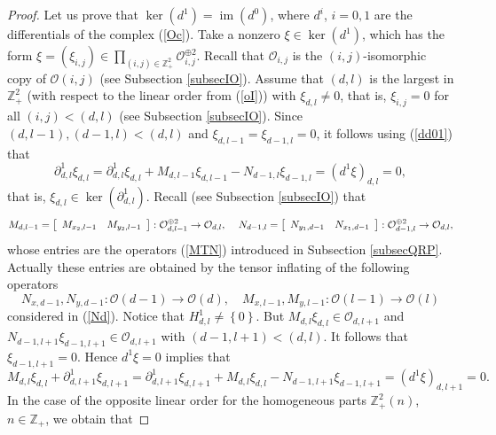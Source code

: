 \documentclass[12pt,reqno]{amsart}%
\theoremstyle{plain}
\numberwithin{theorem}{section} \numberwithin{equation}{section}
\numberwithin{lemma}{section}
\numberwithin{remark}{section}
\numberwithin{example}{section}
\numberwithin{proposition}{section}
\numberwithin{definition}{section}
\numberwithin{corollary}{section}
\begin{document}
\begin{proof}
Let us prove that $\ker\left(  d^{1}\right)  =\operatorname{im}\left(
d^{0}\right)  $, where $d^{i}$, $i=0,1$ are the differentials of the complex
(\ref{Oc}). Take a nonzero $\xi\in\ker\left(  d^{1}\right)  $, which has the
form $\xi=\left(  \xi_{i,j}\right)  \in\prod\limits_{\left(  i,j\right)
\in\mathbb{Z}_{+}^{2}}\mathcal{O}_{i,j}^{\oplus2}$. Recall that $\mathcal{O}%
_{i,j}$ is the $\left(  i,j\right)  $-isomorphic copy of $\mathcal{O}\left(
i,j\right)  $ (see Subsection \ref{subsecIO}). Assume that $\left(
d,l\right)  $ is the largest in $\mathbb{Z}_{+}^{2}$ (with respect to the
linear order from (\ref{oI})) with $\xi_{d,l}\neq0$, that is, $\xi_{i,j}=0$
for all $\left(  i,j\right)  <\left(  d,l\right)  $ (see Subsection
\ref{subsecIO}). Since $\left(  d,l-1\right)  ,\left(  d-1,l\right)  <\left(
d,l\right)  $ and $\xi_{d,l-1}=\xi_{d-1,l}=0$, it follows using (\ref{dd01})
that
\[
\partial_{d,l}^{1}\xi_{d,l}=\partial_{d,l}^{1}\xi_{d,l}+M_{d,l-1}\xi
_{d,l-1}-N_{d-1,l}\xi_{d-1,l}=\left(  d^{1}\xi\right)  _{d,l}=0,
\]
that is, $\xi_{d,l}\in\ker\left(  \partial_{d,l}^{1}\right)  $. Recall (see
Subsection \ref{subsecIO}) that
\[
M_{d,l-1}=\left[
\begin{array}
[c]{cc}%
M_{x_{2},l-1} & M_{y_{2},l-1}%
\end{array}
\right]  :\mathcal{O}_{d,l-1}^{\oplus2}\rightarrow\mathcal{O}_{d,l}\text{,
\quad}N_{d-1,l}=\left[
\begin{array}
[c]{cc}%
N_{y_{1},d-1} & N_{x_{1},d-1}%
\end{array}
\right]  :\mathcal{O}_{d-1,l}^{\oplus2}\rightarrow\mathcal{O}_{d,l},
\]
whose entries are the operators (\ref{MTN}) introduced in Subsection
\ref{subsecQRP}. Actually these entries are obtained by the tensor inflating
of the following operators
\[
N_{x,d-1},N_{y,d-1}:\mathcal{O}\left(  d-1\right)  \rightarrow\mathcal{O}%
\left(  d\right)  ,\quad M_{x,l-1},M_{y,l-1}:\mathcal{O}\left(  l-1\right)
\rightarrow\mathcal{O}\left(  l\right)
\]
considered in (\ref{Nd}). Notice that $H_{d,l}^{1}\neq\left\{  0\right\}  $.
But $M_{d,l}\xi_{d,l}\in\mathcal{O}_{d,l+1}$ and $N_{d-1,l+1}\xi_{d-1,l+1}%
\in\mathcal{O}_{d,l+1}$ with $\left(  d-1,l+1\right)  <\left(  d,l\right)  $.
It follows that $\xi_{d-1,l+1}=0$. Hence $d^{1}\xi=0$ implies that
\[
M_{d,l}\xi_{d,l}+\partial_{d,l+1}^{1}\xi_{d,l+1}=\partial_{d,l+1}^{1}%
\xi_{d,l+1}+M_{d,l}\xi_{d,l}-N_{d-1,l+1}\xi_{d-1,l+1}=\left(  d^{1}\xi\right)
_{d,l+1}=0.
\]
In the case of the opposite linear order for the homogeneous parts
$\mathbb{Z}_{+}^{2}\left(  n\right)  $, $n\in\mathbb{Z}_{+}$, we obtain that

\end{proof}
\end{document}
